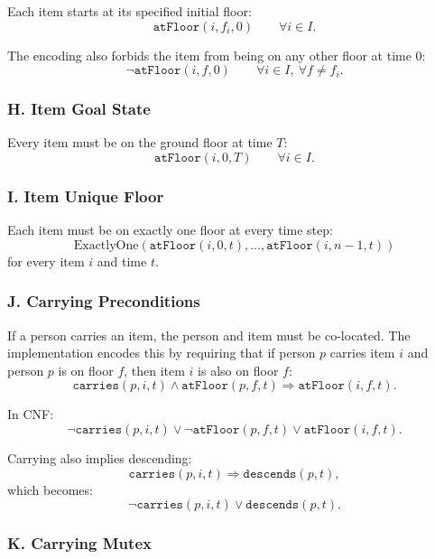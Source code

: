Each item starts at its specified initial floor:
\[
    \texttt{atFloor}(i,f_i,0)
    \qquad \forall i \in I.
\]

\noindent The encoding also forbids the item from being on any other floor at time $0$:
\[
    \neg \texttt{atFloor}(i,f,0)
    \qquad \forall i \in I,\ \forall f \neq f_i.
\]

\subsubsection*{H. Item Goal State}

Every item must be on the ground floor at time $T$:
\[
    \texttt{atFloor}(i,0,T)
    \qquad \forall i \in I.
\]

\subsubsection*{I. Item Unique Floor}

Each item must be on exactly one floor at every time step:
\[
    \text{ExactlyOne}\left(
                         \texttt{atFloor}(i,0,t),
                         \ldots,
                         \texttt{atFloor}(i,n-1,t)
    \right)
\]
for every item $i$ and time $t$.

\subsubsection*{J. Carrying Preconditions}

If a person carries an item, the person and item must be co-located.
The implementation encodes this by requiring that if person $p$ carries item $i$ and person $p$ is on floor $f$, then item $i$ is also on floor $f$:
\[
    \texttt{carries}(p,i,t)
    \land
    \texttt{atFloor}(p,f,t)
    \Rightarrow
    \texttt{atFloor}(i,f,t).
\]

\noindent In CNF:
\[
    \neg \texttt{carries}(p,i,t)
    \lor
    \neg \texttt{atFloor}(p,f,t)
    \lor
    \texttt{atFloor}(i,f,t).
\]

\noindent Carrying also implies descending:
\[
    \texttt{carries}(p,i,t)
    \Rightarrow
    \texttt{descends}(p,t),
\]
which becomes:
\[
    \neg \texttt{carries}(p,i,t)
    \lor
    \texttt{descends}(p,t).
\]

\subsubsection*{K. Carrying Mutex}

